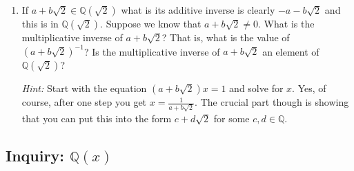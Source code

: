 \documentclass[11pt]{article}
\theoremstyle{definition}
\begin{document}
\begin{enumerate}
      \vspace{1in}

    \item If $a+b\sqrt{2}\in \mathbb{Q}(\sqrt{2})$ what is its additive inverse is clearly $-a-b\sqrt{2}$ and this is in $\mathbb{Q}(\sqrt{2})$. Suppose
      we know that $a+b\sqrt{2} \neq 0$. What is the multiplicative inverse of $a+b\sqrt{2}$? That is, what is the value of $(a+b\sqrt{2})^{-1}$? Is
      the multiplicative inverse of $a+b\sqrt{2}$ an element of $\mathbb{Q}(\sqrt{2})$?

      \textit{Hint:} Start with the equation $(a+b\sqrt{2})x = 1$ and solve for $x$. Yes, of course, after one step you get $x=\frac{1}{a+b\sqrt{2}}$. The
      crucial part though is showing that you can put this into the form $c+d\sqrt{2}$ for some $c,d\in\mathbb{Q}$.

      \vspace{1in}
  \end{enumerate}\newpage

\subsection{Inquiry: $\mathbb{Q}(x)$}
\end{document}
